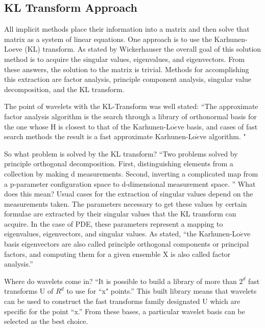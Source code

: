 \subsection {KL Transform Approach}
All implicit methods place their information into a matrix and then solve that matrix as a system of linear equations.  One approach is to use the Karhunen-Loeve (KL) transform.   As stated by Wickerhauser \cite{victor} the overall goal of this solution method is to acquire the singular values, eigenvalues, and eigenvectors.  From these answers, the solution to the matrix is trivial.  Methods for accomplishing this extraction are factor analysis, principle component analysis, singular value decomposition, and the KL transform.  



The point of wavelets with the KL-Transform was well stated: ``The approximate factor analysis algorithm is the search through a library of orthonormal basis for the one whose H is closest to that of the Karhunen-Lo$\grave{e}$ve basis, and cases of fast search methods the result is a fast approximate Karhunen-Lo$\grave{e}$ve algorithm.  "\cite{victor}  

So what problem is solved by the KL transform?   ``Two problems solved by  principle orthogonal decomposition.  First, distinguishing elements from a collection by making d measurements.  Second, inverting a complicated map from a p-parameter configuration space to d-dimensional measurement space. '' \cite{victor}  What does this mean?  Usual cases for the extraction of singular values depend on the measurements taken.  The parameters necessary to get these values by certain formulae are extracted by their singular values that the KL transform can acquire.  In the case of PDE, these parameters represent a mapping to eigenvalues, eigenvectors, and singular values.  As stated, ``the Karhunen-Lo$\grave{e}$ve basis eigenvectors are also called principle orthogonal components or principal factors, and computing them for a given ensemble X is also called factor analysis.''\cite{victor}

Where do wavelets come in?   ``It is possible to build a library of more than $2^d$ fast transforms U of $R^d$ to use for ``x" points.''\cite{victor}
 This  built library means that wavelets can be used to construct the fast transforms family designated U which are specific for the point ``x.''  From these bases, a particular wavelet basis can be selected as the best choice. %

